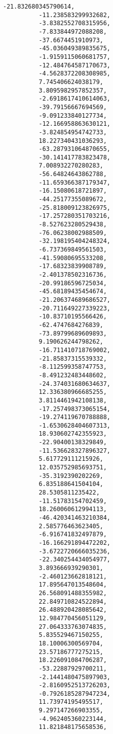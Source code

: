 \documentclass[11pt]{article}
\begin{document}
\begin{Verbatim}[commandchars=\\\{\}]
          -21.832680345790614,
          -11.238583299932682,
          -3.8382552708315956,
          -7.833844972088208,
          -37.6674451910973,
          -45.036049389835675,
          -1.9159115060681757,
          -12.484764587170673,
          -4.5628372208308985,
          7.745406624038179,
          3.8095982957852357,
          -2.6918617410614063,
          -39.79156667694569,
          -9.091233840127734,
          -12.166958863630121,
          -3.824854954742733,
          18.227340431036293,
          -63.287931064870655,
          -30.141417783823478,
          7.008932270280283,
          -56.64824643862788,
          -11.659366387179347,
          -16.15080618721897,
          -44.25177355089672,
          -25.818009123826975,
          -17.257280351703216,
          -8.527623280529438,
          -76.06238002988509,
          -32.198195404248324,
          -6.737369849561503,
          -41.59080695533208,
          -17.68323839908789,
          -2.401378502316736,
          -20.99186596725034,
          -45.68189435454674,
          -21.206374689686527,
          -20.711649227339223,
          -10.83710195566426,
          -62.4747684276839,
          -73.89799689609893,
          9.190626244798262,
          -16.711410718769002,
          -21.85837315539332,
          -8.112599358747753,
          -8.491232483448602,
          -24.374031680634637,
          12.336380966685255,
          3.8114461942108138,
          -17.257498373065154,
          -19.274119670788888,
          -1.6530628404607313,
          18.930602742355923,
          -22.90400138329849,
          -11.536628327896327,
          5.617729111215926,
          12.035752985693751,
          -35.3192390202269,
          6.835188641504104,
          28.5305811235422,
          -11.51783154702459,
          18.260060612994113,
          -46.420341463210384,
          2.585776463623405,
          -6.916741832497879,
          -16.166291894472202,
          -3.6722720666035236,
          -22.340254434054977,
          3.893666939290301,
          -2.460123662818121,
          17.895647013548604,
          26.568091488355982,
          22.849710824522894,
          26.488920428085642,
          12.984770456051129,
          27.064333763074835,
          5.835529467150255,
          18.10006300569704,
          23.57186777275215,
          18.226091084706287,
          -53.22887929700211,
          -2.1441480475897903,
          -2.8160952513726203,
          -0.7926185287947234,
          11.73974195495517,
          9.297147266903355,
          -4.962405360223144,
          11.821848175658536,

\end{Verbatim}
\end{document}
